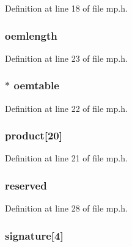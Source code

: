 Definition at line 18 of file mp.\-h.

\hypertarget{structmpconf_a1ceb9c0f37d610f220e21ff80705be9c}{
\subsubsection[{oemlength}]{ oemlength}}\label{structmpconf_a1ceb9c0f37d610f220e21ff80705be9c}


Definition at line 23 of file mp.\-h.

\hypertarget{structmpconf_a4a32c8dcc1dc530dd624029c57e7cc5c}{
\subsubsection[{oemtable}]{$\ast$ oemtable}}\label{structmpconf_a4a32c8dcc1dc530dd624029c57e7cc5c}


Definition at line 22 of file mp.\-h.

\hypertarget{structmpconf_a09544b0a747e1c8a0ff64be0392f5c43}{
\subsubsection[{product}]{ product\mbox{[}20\mbox{]}}}\label{structmpconf_a09544b0a747e1c8a0ff64be0392f5c43}


Definition at line 21 of file mp.\-h.

\hypertarget{structmpconf_a8d5874ade2fd6c06fdfd5530f0ec417d}{
\subsubsection[{reserved}]{ reserved}}\label{structmpconf_a8d5874ade2fd6c06fdfd5530f0ec417d}


Definition at line 28 of file mp.\-h.

\hypertarget{structmpconf_a086ff3269e8b74e0f05b9120d4cac23b}{
\subsubsection[{signature}]{ signature\mbox{[}4\mbox{]}}}\label{structmpconf_a086ff3269e8b74e0f05b9120d4cac23b}


